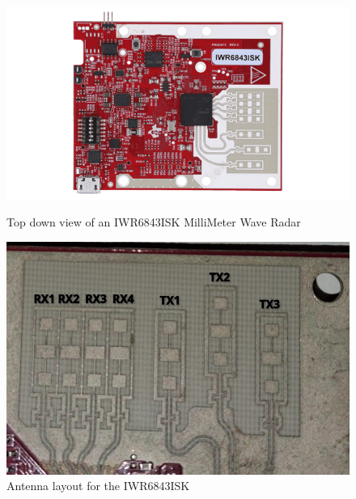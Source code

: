 \begin{figure}[h]
    \begin{minipage}[c]{0.45\linewidth}
        \includegraphics[width=0.95\linewidth]{figures/mmwave/iwr6843isk-top-sideways.png}
        \caption{Top down view of an IWR6843ISK MilliMeter Wave Radar}
        \label{fig:mmwave_radar_top_view}
    \end{minipage}
    \begin{minipage}[c]{0.45\linewidth}
        \includegraphics[width=0.95\linewidth]{figures/mmwave/WhatsApp Image 2025-10-28 at 15.59.05.jpeg}
        \caption{Antenna layout for the IWR6843ISK}
        \label{fig:mmwave_radar_antennas}
    \end{minipage}
\end{figure}

